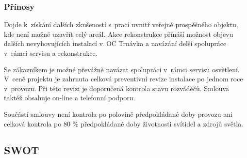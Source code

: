 \documentclass[a4paper, twoside, 11pt]{article}
\begin{document}
		\subsubsection{Přínosy}
			Dojde k~získání dalších zkušeností s~prací uvnitř veřejně prospěšného objektu, kde není možné uzavřít celý areál. Akce rekonstrukce přínáší možnost objevu dalších nevyhovujících instalací v~OC Trnávka a navázání delší spolupráce v~rámci servisu a rekonstrukce.\par
			Se zákazníkem je možné převážně navázat spolupráci v~rámci servisu osvětlení. V~ceně projektu je zahrnuta celková preventivní revize instalace po jednom roce v~provozu. Při této revizi je doporučená kontrola stavu rozváděčů. Smlouva taktéž obsahuje on-line a telefonní podporu. \par
			Součástí smlouvy není kontrola po polovině předpokládané doby provozu ani celková kontrola po 80 \% předpokládané doby životnosti svítidel a zdrojů světla.
			
	\subsection{SWOT}	
	
\end{document}
